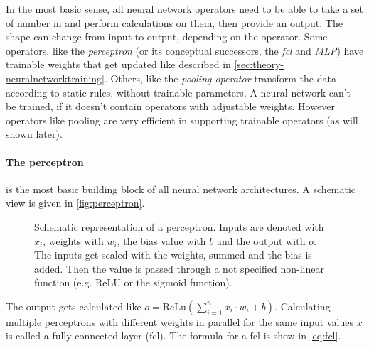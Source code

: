 In the most basic sense, all neural network operators need to be able to take a set of number in and perform calculations on them, then provide an output.
The shape can change from input to output, depending on the operator.
Some operators, like the \emph{perceptron} (or its conceptual successors, the \emph{fcl} and \emph{MLP}) have trainable weights that get updated like described in \autoref{sec:theory-neuralnetworktraining}.
Others, like the \emph{pooling operator} transform the data according to static rules, without trainable parameters.
A neural network can't be trained, if it doesn't contain operators with adjustable weights.
However operators like pooling are very efficient in supporting trainable operators (as will shown later).

\paragraph{The perceptron} is the most basic building block of all neural network architectures.
A schematic view is given in \autoref{fig:perceptron}.

\begin{figure}[htbp]
    \centering
    \caption{Schematic representation of a perceptron. Inputs are denoted with $x_i$, weights with $w_i$, the bias value with $b$ and the output with $o$. 
        The inputs get scaled with the weights, summed and the bias is added.
        Then the value is passed through a not specified non-linear function (e.g. ReLU or the sigmoid function).
    }
    \label{fig:perceptron}
\end{figure}

The output gets calculated like $o = \mathrm{ReLu} \left(\sum\limits_{i=1}^{n} x_i\cdot w_i + b\right)$.
Calculating multiple perceptrons with different weights in parallel for the same input values $x$is called a fully connected layer (fcl).
The formula for a fcl is show in \autoref{eq:fcl}.

